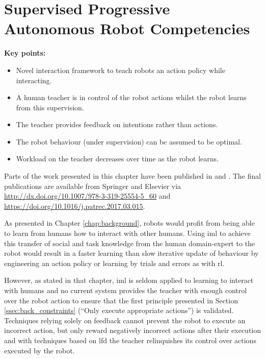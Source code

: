 \chapter{Supervised Progressive Autonomous Robot Competencies}\label{chap:sparc}

\begin{framed}
	\textbf{Key points:}
	\begin{itemize}
		\item Novel interaction framework to teach robots an action policy while interacting.
		\item A human teacher is in control of the robot actions whilst the robot learns from this supervision.
		\item The teacher provides feedback on intentions rather than actions.
		\item The robot behaviour (under supervision) can be assumed to be optimal.
		\item Workload on the teacher decreases over time as the robot learns.
	\end{itemize}
\end{framed}

Parts of the work presented in this chapter have been published in \cite{senft2015sparc} and \cite{senft2017supervised}. The final publications are available from Springer and Elsevier via \url{http://dx.doi.org/10.1007/978-3-319-25554-5_60} and \url{https://doi.org/10.1016/j.patrec.2017.03.015}.

\newpage

As presented in Chapter \ref{chap:background}, robots would profit from being able to learn from humans how to interact with other humans. Using \gls{iml} to achieve this transfer of social and task knowledge from the human domain-expert to the robot would result in a faster learning than slow iterative update of behaviour by engineering an action policy or learning by trials and errors as with \gls{rl}.

However, as stated in that chapter, \gls{iml} is seldom applied to learning to interact with humans and no current system provides the teacher with enough control over the robot action to ensure that the first principle presented in Section \ref{ssec:back_constraints} (``Only execute appropriate actions'') is validated. Techniques relying solely on feedback cannot prevent the robot to execute an incorrect action, but only reward negatively incorrect actions after their execution \citep{senft2017supervised} and with techniques based on \gls{lfd} the teacher relinquishes its control over actions executed by the robot.

